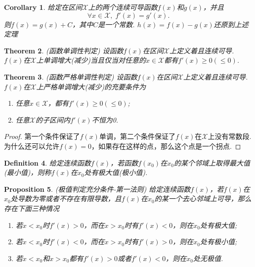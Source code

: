 \documentclass{article}
\newtheorem{theorem}{Theorem}[section]
\newtheorem{corollary}[theorem]{Corollary}
\newtheorem{proposition}[theorem]{Proposition}
\newtheorem{definition}[theorem]{Definition}
\begin{document}
\begin{corollary}
\rm 给定在区间$\mathcal{X}$上的两个连续可导函数$f(x)$和$g(x)$，并且
$$
\forall x \in \mathcal{X},\;f'(x) = g'(x).
$$
则$f(x) = g(x) + C$，其中$C$是一个常数. {\color{red} $h(x) = f(x) - g(x)$还原到上述定理}
\end{corollary}


\begin{theorem}
\rm {\color{red} (函数单调性判定)} 设函数$f(x)$在区间$\mathcal{X}$上定义着且连续可导. $f(x)$在$\mathcal{X}$上单调增大(减少)当且仅当对任意的$x \in \mathcal{X}$都有$f'(x) \geq 0(\leq 0)$.
\end{theorem}

\begin{theorem}
\rm {\color{red} (函数严格单调性判定)} 设函数$f(x)$在区间$\mathcal{X}$上定义着且连续可导. $f(x)$在$\mathcal{X}$上严格单调增大(减少)的充要条件为
\begin{enumerate}
	\item 任意$x \in \mathcal{X}$，都有$f'(x) \geq 0(\leq 0)$;
	\item 任意$\mathcal{X}$的子区间内$f'(x)$不恒为0.
\end{enumerate}
\end{theorem}

\begin{proof}
{\color{blue}第一个条件保证了$f(x)$单调，第二个条件保证了$f(x)$在$\mathcal{X}$上没有常数段. 为什么还可以允许$f(x)=0$，如果存在这样的点，那么这个点是一个拐点}.
\end{proof}

\begin{definition}
\rm 给定连续函数$f(x)$，若函数$f(x_0)$在$x_0$的某个邻域上取得最大值(最小值)，则称$f(x)$在$x_0$处有{\color{red}极大值(极小值)}.
\end{definition}

\begin{proposition}
\rm {\color{red} (极值判定充分条件-第一法则)} \rm 给定连续函数$f(x)$，若$f(x)$在$x_0$处导数为零或者不存在有限导数，且$f(x)$在$x_0$的某一个去心邻域上可导，那么存在下面三种情况
\begin{enumerate}
	\item 若$x < x_0$时$f'(x) > 0$，而在$x > x_0$时有$f'(x) < 0$，则在$x_0$处有极大值;
	\item 若$x < x_0$时$f'(x) < 0$，而在$x > x_0$时有$f'(x) > 0$，则在$x_0$处有极小值;
	\item 若$x < x_0$和$x > x_0$都有$f'(x) > 0$或者$f'(x) < 0$，则在$x_0$处无极值.
\end{enumerate}
\end{proposition}
\end{document}
